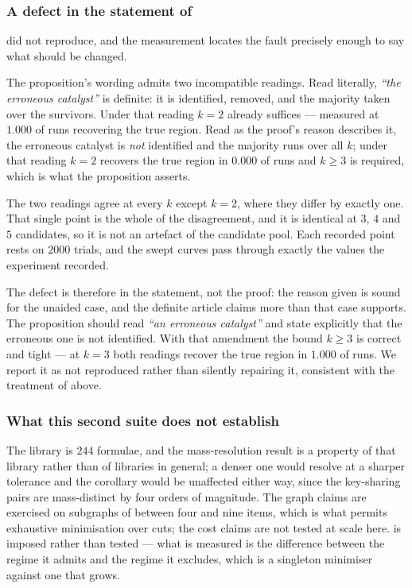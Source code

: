 \documentclass[11pt,a4paper]{article}
\theoremstyle{definition}
\theoremstyle{remark}
\begin{document}
\subsubsection{A defect in the statement of
\texorpdfstring{}{Proposition: three catalysts}}
\label{ssec:three-defect}

 did not reproduce, and the measurement locates the
fault precisely enough to say what should be changed.

The proposition's wording admits two incompatible readings. Read
literally, \emph{``the erroneous catalyst''} is definite: it is
identified, removed, and the majority taken over the survivors. Under
that reading $k = 2$ already suffices --- measured at $1.000$ of runs
recovering the true region. Read as the proof's reason describes it, the
erroneous catalyst is \emph{not} identified and the majority runs over
all $k$; under that reading $k = 2$ recovers the true region in $0.000$
of runs and $k \ge 3$ is required, which is what the proposition
asserts.

The two readings agree at every $k$ except $k = 2$, where they differ by
exactly one. That single point is the whole of the disagreement, and it
is identical at $3$, $4$ and $5$ candidates, so it is not an artefact of
the candidate pool. Each recorded point rests on $2000$ trials, and the
swept curves pass through exactly the values the experiment recorded.

The defect is therefore in the statement, not the proof: the reason
given is sound for the unaided case, and the definite article claims
more than that case supports. The proposition should read \emph{``an
erroneous catalyst''} and state explicitly that the erroneous one is not
identified. With that amendment the bound $k \ge 3$ is correct and tight
--- at $k = 3$ both readings recover the true region in $1.000$ of runs.
We report it as not reproduced rather than silently repairing it,
consistent with the treatment of  above.

\subsubsection{What this second suite does not establish}

The library is $244$ formulae, and the mass-resolution result is a
property of that library rather than of libraries in general; a denser
one would resolve at a sharper tolerance and the corollary would be
unaffected either way, since the key-sharing pairs are mass-distinct by
four orders of magnitude. The graph claims are exercised on subgraphs of
between four and nine items, which is what permits exhaustive
minimisation over cuts; the cost claims are not tested at scale here.
 is imposed rather than tested --- what is measured
is the difference between the regime it admits and the regime it
excludes, which is a singleton minimiser against one that grows.
\end{document}
